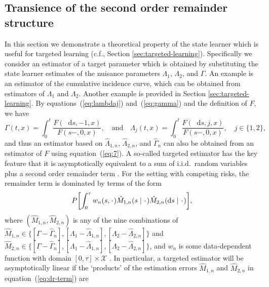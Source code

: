 \documentclass[11pt]{article}
\theoremstyle{thmstyleone}%
\theoremstyle{thmstyletwo}%
\theoremstyle{thmstylethree}%
\newcommand{\blank}{\makebox[1ex]{\textbf{$\cdot$}}}
\newcommand*\diff{\mathop{}\!\mathrm{d}}
\newcommand{\1}{\mathds{1}}
\begin{document}
\subsection{Transience of the second order remainder structure}

In this section we demonstrate a theoretical property of the state
learner which is useful for targeted learning (c.f., Section
\ref{sec:targeted-learning}). Specifically we consider an estimator of
a target parameter which is obtained by substituting the state learner
estimates of the nuisance parameters $\Lambda_1$, $\Lambda_2$, and
$\Gamma$. An example is an estimator of the cumulative incidence
curve, which can be obtained from estimators of $\Lambda_1$ and
$\Lambda_2$. Another example is provided in Section \ref{sec:targeted-learning}.
By equations~(\ref{eq:lambdaj}) and~(\ref{eq:gamma}) and the definition of
\( F \), we have
\begin{equation}
  \label{eq:7}
  \Gamma(t , x) 
  = \int_0^t  \frac{F(\diff s, -1, x )}{F(s-, 0, x )},
  \quad \text{and} \quad
  \Lambda_j(t , x) 
  = \int_0^t  \frac{F(\diff s, j, x )}{F(s-, 0, x )},
  \quad j \in \{1,2\},
\end{equation}
and thus an estimator based on \( \hat{\Lambda}_{1,n} \),
\( \hat{\Lambda}_{2,n} \), and \( \hat{\Gamma}_{n} \) can also be obtained from
an estimator of $F$ using equation~(\ref{eq:7}). A so-called targeted estimator
has the key feature that it is asymptotically equivalent to a sum of i.i.d.\
random variables plus a second order remainder term
\citep{van2011targeted,hines2022demystifying}. For the setting with competing
risks, the remainder term is dominated by terms of the form
\begin{equation}
  \label{eq:dr-term}
  P{\left[
      \int_0^{\tau} w_n(s, \blank)
      \hat{M}_{1,n}(s \mid  \blank)
      \hat{M}_{2,n}(\diff s \mid  \blank)
    \right]},
\end{equation}
where \( (\hat{M}_{1,n}, \hat{M}_{2,n}) \) is any of the nine combinations of
\( \hat{M}_{1,n} \in \{[\Gamma -\hat{\Gamma}_n], [\Lambda_1
-\hat{\Lambda}_{1,n}], [\Lambda_2 -\hat{\Lambda}_{2,n}]\} \) and
\( \hat{M}_{2,n} \in \{[\Gamma -\hat{\Gamma}_n], [\Lambda_1
-\hat{\Lambda}_{1,n}], [\Lambda_2 -\hat{\Lambda}_{2,n}]\} \), and \( w_n \) is
some data-dependent function with domain \([0,\tau]\times\mathcal X \)
\citep{van2003unified}. In particular, a targeted estimator will be
asymptotically linear if the `products' of the estimation errors
\( \hat{M}_{1,n} \) and \( \hat{M}_{2,n} \) in equation~(\ref{eq:dr-term}) are
\end{document}

